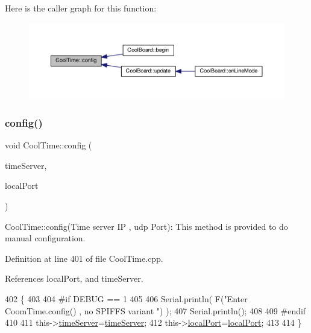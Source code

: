 Here is the caller graph for this function\+:
\nopagebreak
\begin{figure}[H]
\begin{center}
\leavevmode
\includegraphics[width=350pt]{classCoolTime_a87c28260c1bc77091162cbcf1ee2e129_icgraph}
\end{center}
\end{figure}
\mbox{\label{classCoolTime_a014656d0d3f74d6391364b92b13e0780}} 
\subsubsection{\texorpdfstring{config()}{config()}\hspace{0.1cm}{\footnotesize\ttfamily [2/2]}}
{\footnotesize\ttfamily void Cool\+Time\+::config (\begin{DoxyParamCaption}\item[{I\+P\+Address}]{time\+Server,  }\item[{unsigned int}]{local\+Port }\end{DoxyParamCaption})}

Cool\+Time\+::config(\+Time server I\+P , udp Port)\+: This method is provided to do manual configuration. 

Definition at line 401 of file Cool\+Time.\+cpp.



References local\+Port, and time\+Server.


\begin{DoxyCode}
402 \{
403 
404 \textcolor{preprocessor}{#if DEBUG == 1 }
405 
406     Serial.println( F(\textcolor{stringliteral}{"Enter CoomTime.config() , no SPIFFS variant "}) );
407     Serial.println();
408 
409 \textcolor{preprocessor}{#endif }
410 
411     this->\hyperlink{classCoolTime_ad2b9858f399108cb440dd1e908916f04}{timeServer}=\hyperlink{classCoolTime_ad2b9858f399108cb440dd1e908916f04}{timeServer};
412     this->\hyperlink{classCoolTime_a2f777da44d7ba678be8185299e9b49d1}{localPort}=\hyperlink{classCoolTime_a2f777da44d7ba678be8185299e9b49d1}{localPort};
413     
414 \} 
\end{DoxyCode}
\mbox{\label{classCoolTime_acd537cd4210d7bde4e1f5c47d2ac0456}} 
